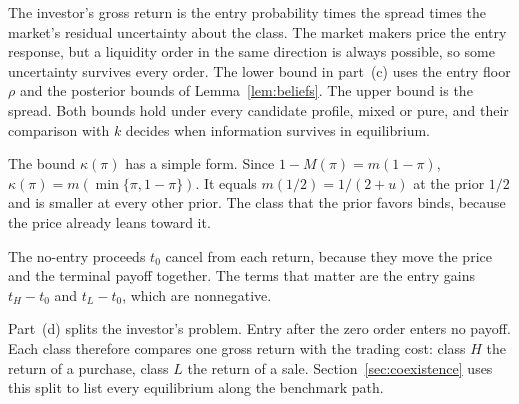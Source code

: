 The investor's gross return is the entry probability times the spread times the market's residual uncertainty
about the class. The market makers price the entry response, but a liquidity order in the same direction is always
possible, so some uncertainty survives every order. The lower bound in part~(c) uses the entry floor \(\rho\) and
the posterior bounds of Lemma~\ref{lem:beliefs}. The upper bound is the spread. Both bounds hold under every
candidate profile, mixed or pure, and their comparison with \(k\) decides when information survives in
equilibrium.

The bound \(\kappa(\pi)\) has a simple form. Since \(1-M(\pi)=m(1-\pi)\), \(\kappa(\pi)=m(\min\{\pi,1-\pi\})\). It
equals \(m(1/2)=1/(2+u)\) at the prior \(1/2\) and is smaller at every other prior. The class that the prior
favors binds, because the price already leans toward it.

The no-entry proceeds \(t_0\) cancel from each return, because they move the price and the terminal payoff
together. The terms that matter are the entry gains \(t_H-t_0\) and \(t_L-t_0\), which are nonnegative.

Part~(d) splits the investor's problem. Entry after the zero order enters no payoff. Each class therefore compares
one gross return with the trading cost: class \(H\) the return of a purchase, class \(L\) the return of a sale.
Section~\ref{sec:coexistence} uses this split to list every equilibrium along the benchmark path.
